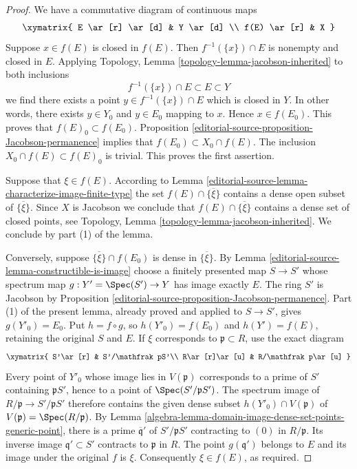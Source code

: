 \begin{proof}
We have a commutative diagram of continuous maps
$$
\xymatrix{
E \ar[r] \ar[d] & Y \ar[d] \\
f(E) \ar[r] & X
}
$$
Suppose $x \in f(E)$ is closed in $f(E)$. Then $f^{-1}(\{x\})\cap E$
is nonempty and closed in $E$. Applying
Topology, Lemma \ref{topology-lemma-jacobson-inherited}
to both inclusions
$$
f^{-1}(\{x\}) \cap E \subset E \subset Y
$$
we find there exists a point $y \in f^{-1}(\{x\}) \cap E$ which is
closed in $Y$. In other words, there exists $y \in Y_0$ and $y \in E_0$
mapping to $x$. Hence $x \in f(E_0)$.
This proves that $f(E)_0 \subset f(E_0)$.
Proposition \ref{editorial-source-proposition-Jacobson-permanence} implies that
$f(E_0) \subset X_0 \cap f(E)$. The inclusion
$X_0 \cap f(E) \subset f(E)_0$ is trivial. This proves the
first assertion.

\medskip\noindent
Suppose that $\xi \in f(E)$. According to
Lemma \ref{editorial-source-lemma-characterize-image-finite-type}
the set $f(E) \cap \overline{\{\xi\}}$ contains a dense
open subset of $\overline{\{\xi\}}$. Since $X$ is Jacobson
we conclude that $f(E) \cap \overline{\{\xi\}}$ contains a
dense set of closed points, see Topology,
Lemma \ref{topology-lemma-jacobson-inherited}.
We conclude by part (1) of the lemma.

\medskip\noindent
Conversely, suppose $\overline{\{\xi\}}\cap f(E_0)$ is dense
in $\overline{\{\xi\}}$. By Lemma \ref{editorial-source-lemma-constructible-is-image}
choose a finitely presented map $S\to S'$ whose spectrum map
$g:Y'=\Spec(S')\to Y$ has image exactly $E$.
The ring $S'$ is Jacobson by Proposition \ref{editorial-source-proposition-Jacobson-permanence}.
Part (1) of the present lemma, already proved and applied to $S\to S'$,
gives $g(Y'_0)=E_0$. Put $h=f\circ g$, so
$h(Y'_0)=f(E_0)$ and $h(Y')=f(E)$, retaining the original $S$ and $E$.
If $\xi$ corresponds to $\mathfrak p\subset R$, use the exact diagram
$$
\xymatrix{
S'\ar[r] & S'/\mathfrak pS'\\
R\ar[r]\ar[u] & R/\mathfrak p\ar[u]
}
$$
Every point of $Y'_0$ whose image lies in $V(\mathfrak p)$ corresponds
to a prime of $S'$ containing $\mathfrak pS'$, hence to a point of
$\Spec(S'/\mathfrak pS')$. The spectrum image of
$R/\mathfrak p\to S'/\mathfrak pS'$ therefore contains the given
dense subset $h(Y'_0)\cap V(\mathfrak p)$ of
$V(\mathfrak p)=\Spec(R/\mathfrak p)$.
By Lemma \ref{algebra-lemma-domain-image-dense-set-points-generic-point},
there is a prime $\overline{\mathfrak q}'$ of $S'/\mathfrak pS'$
contracting to $(0)$ in $R/\mathfrak p$. Its inverse image
$\mathfrak q'\subset S'$ contracts to $\mathfrak p$ in $R$.
The point $g(\mathfrak q')$ belongs to $E$ and its image under the
original $f$ is $\xi$. Consequently $\xi\in f(E)$, as required.
\end{proof}


